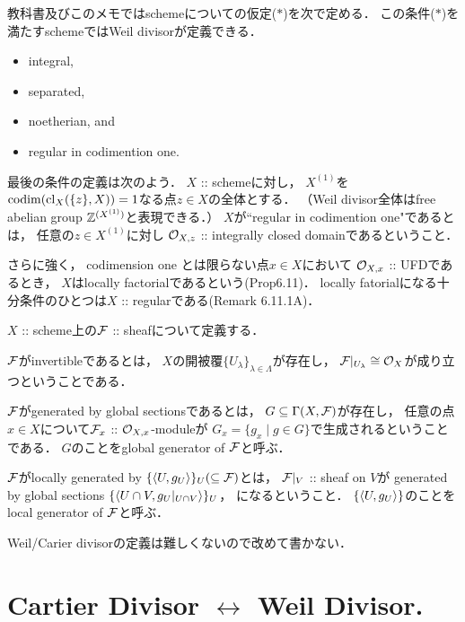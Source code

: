 \documentclass[a4paper]{jsarticle}
\begin{document}
\begin{Def}
    教科書及びこのメモではschemeについての仮定($*$)を次で定める．
    この条件($*$)を満たすschemeではWeil divisorが定義できる．
    \begin{itemize}
        \item integral,
        \item separated,
        \item noetherian, and
        \item regular in codimention one.
    \end{itemize}

    最後の条件の定義は次のよう．
    $X$ :: schemeに対し，
    $X^{(1)}$を$\operatorname{codim}(\operatorname{cl}_X(\{z\},X))=1$なる点$z \in X$の全体とする．
    （Weil divisor全体はfree abelian group $\mathbb{Z}^{(X^{(1)})}$と表現できる．）
    $X$が``regular in codimention one"であるとは，
    任意の$z \in X^{(1)}$に対し
    $\mathcal{O}_{X,z}$ :: integrally closed domainであるということ．

    さらに強く，
    codimension one とは限らない点$x \in X$において
    $\mathcal{O}_{X,x}$ :: UFDであるとき，
    $X$はlocally factorialであるという(Prop6.11)．
    locally fatorialになる十分条件のひとつは$X$ :: regularである(Remark 6.11.1A)．
\end{Def}

\begin{Def}
    $X$ :: scheme上の$\mathcal{F}$ :: sheafについて定義する．
    
    $\mathcal{F}$がinvertibleであるとは，
    $X$の開被覆$\{ U_{\lambda} \}_{\lambda \in \Lambda}$が存在し，
    $\mathcal{F}|_{U_{\lambda}} \cong \mathcal{O}_X$が成り立つということである．

    $\mathcal{F}$がgenerated by global sectionsであるとは，
    $G \subseteq \Gamma(X,\mathcal{F})$が存在し，
    任意の点$x \in X$について$\mathcal{F}_x$ :: $\mathcal{O}_{X,x}$-moduleが
    $G_x=\{ g_x \mid g \in G \}$で生成されるということである．
    $G$のことをglobal generator of $\mathcal{F}$と呼ぶ．

    $\mathcal{F}$がlocally generated by $\{\langle U,g_U \rangle\}_U (\subseteq \mathcal{F})$とは，
    $\mathcal{F}|_V$ :: sheaf on $V$が
    generated by global sections $\{\langle U \cap V,g_U|_{U \cap V} \rangle\}_U$，
    になるということ．
    $\{\langle U,g_U \rangle\}$のことをlocal generator of $\mathcal{F}$と呼ぶ．
\end{Def}

    Weil/Carier divisorの定義は難しくないので改めて書かない．

\section{Cartier Divisor $\leftrightarrow$ Weil Divisor.}
\end{document}
